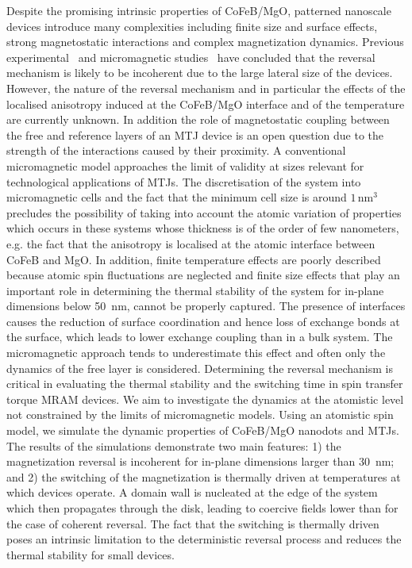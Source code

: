 \documentclass[aps,prb,signlecolumn,preprint,superscriptaddress,10]{revtex4-1}
\begin{document}
Despite the promising intrinsic properties of CoFeB/MgO, patterned nanoscale devices introduce many complexities including finite size and surface effects, strong magnetostatic interactions and complex magnetization dynamics. Previous experimental~\cite{:/content/aip/journal/apl/107/15/10.1063/1.4933256,Sato2014,6189858} and micromagnetic studies~\cite{Jang2015,Sampaio2016,Song2015} 
 have concluded that the reversal mechanism is likely to be incoherent due to the large lateral size of the devices. However, the nature of the reversal mechanism and in particular the effects of the localised anisotropy induced at the CoFeB/MgO interface and of the temperature are currently unknown. In addition the role of magnetostatic coupling between the free and reference layers of an MTJ device is an open question due to the strength of the interactions caused by their proximity. 
A conventional micromagnetic model approaches the limit of validity at sizes relevant for technological applications of MTJs. The discretisation of the system into micromagnetic cells and the fact that the minimum cell size is around $1\,\mathrm{nm}^3$ precludes the possibility of taking into account the atomic variation of properties which occurs in these systems whose thickness is of the order of few nanometers, e.g. the fact that the anisotropy is localised at the atomic interface between CoFeB and MgO. In addition, finite temperature effects are poorly described because atomic spin fluctuations are neglected and finite size effects that play an important role in determining the thermal stability of the system for in-plane dimensions below 50~nm, cannot be properly captured. The presence of interfaces causes the reduction of surface coordination and hence loss of exchange bonds at the surface, which leads to lower exchange coupling than in a bulk system. The micromagnetic approach tends to underestimate this effect and often only the dynamics of the free layer is considered.
Determining the reversal mechanism is critical in evaluating the thermal stability and the switching time in spin transfer torque MRAM devices. We aim to investigate the dynamics at the atomistic level not constrained by the limits of micromagnetic models. Using an atomistic spin model, we simulate the dynamic properties of CoFeB/MgO nanodots and MTJs. The results of the simulations demonstrate two main features: 1) the magnetization reversal is incoherent for in-plane dimensions larger than 30~nm; and 2) the switching of the magnetization is thermally driven at temperatures at which devices operate. A domain wall is nucleated at the edge of the system which then propagates through the disk, leading to coercive fields lower than for the case of coherent reversal. The fact that the switching is thermally driven poses an intrinsic limitation to the deterministic reversal process and reduces the thermal stability for small devices.  
%
\end{document}
